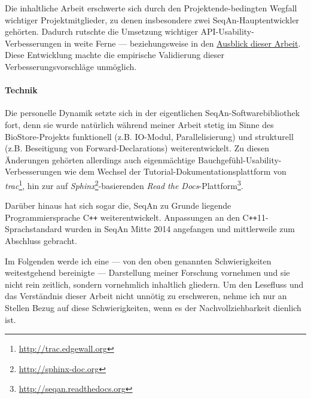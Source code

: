Die inhaltliche Arbeit erschwerte sich durch den Projektende-bedingten Wegfall wichtiger Projektmitglieder, zu denen insbesondere zwei SeqAn-Hauptentwickler gehörten. Dadurch rutschte die Umsetzung wichtiger API-Usability-Verbesserungen in weite Ferne --- beziehungsweise in den \href{sec:ausblick}{Ausblick dieser Arbeit}. Diese Entwicklung machte die empirische Validierung dieser Verbesserungsvorschläge unmöglich.

\paragraph{Technik}

Die personelle Dynamik setzte sich in der eigentlichen SeqAn-Softwarebibliothek fort, denn sie wurde natürlich während meiner Arbeit stetig im Sinne des BioStore-Projekts funktionell (z.B. IO-Modul, Parallelisierung) und strukturell (z.B. Beseitigung von Forward-Declarations) weiterentwickelt. Zu diesen Änderungen gehörten allerdings auch eigenmächtige Bauchgefühl-Usability-Verbesserungen wie dem Wechsel der Tutorial-Dokumentationsplattform von \textit{trac}\footnote{\url{http://trac.edgewall.org}}, hin zur auf \textit{Sphinx}\footnote{\url{http://sphinx-doc.org}}-basierenden \textit{Read the Docs}-Plattform\footnote{\url{http://seqan.readthedocs.org}}.


Darüber hinaus hat sich sogar die, SeqAn zu Grunde liegende Programmiersprache C{}\verb!++! weiterentwickelt. Anpassungen an den C{}\verb!++!11-Sprachstandard wurden in SeqAn Mitte 2014 angefangen und mittlerweile zum Abschluss gebracht.

\bigskip

Im Folgenden werde ich eine --- von den oben genannten Schwierigkeiten weitestgehend bereinigte --- Darstellung meiner Forschung vornehmen und sie nicht rein zeitlich, sondern vornehmlich inhaltlich gliedern. Um den Lesefluss und das Verständnis dieser Arbeit nicht unnötig zu erschweren, nehme ich nur an Stellen Bezug auf diese Schwierigkeiten, wenn es der Nachvollziehbarkeit dienlich ist.